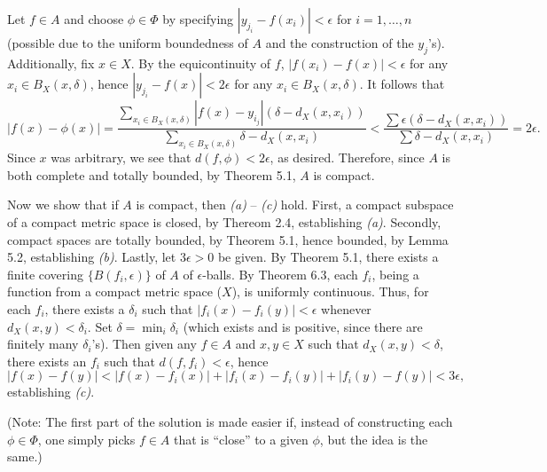 \documentclass{article}
\begin{document}
\begin{enumerate}
Let \(f \in A\) and choose \(\phi \in \Phi\) by specifying \(\left| y_{j_i} - f(x_i) \right| < \epsilon\) for \(i = 1, \ldots, n\) (possible due to the uniform boundedness of \(A\) and the construction of the \(y_j\)'s).  Additionally, fix \(x \in X\).  By the equicontinuity of \(f\), \(|f(x_i) - f(x)| < \epsilon\) for any \(x_i \in B_X(x,\delta)\), hence \(\left| y_{j_i} - f(x) \right| < 2\epsilon\) for any \(x_i \in B_X(x,\delta)\).  It follows that
\[|f(x) - \phi(x)| = \frac{\sum_{x_i \in B_X(x,\delta)} \left| f(x) - y_{i_j} \right| (\delta - d_X(x,x_i))}{\sum_{x_i \in B_X(x,\delta)} \delta - d_X(x,x_i)} < \frac{\sum \epsilon (\delta - d_X(x,x_i))}{\sum \delta - d_X(x,x_i)} = 2\epsilon.\]
Since \(x\) was arbitrary, we see that \(d(f,\phi) < 2\epsilon\), as desired.  Therefore, since \(A\) is both complete and totally bounded, by Theorem 5.1, \(A\) is compact.

Now we show that if \(A\) is compact, then {\em (a)} -- {\em (c)} hold.  First, a compact subspace of a compact metric space is closed, by Thereom 2.4, establishing {\em (a)}.  Secondly, compact spaces are totally bounded, by Theorem 5.1, hence bounded, by Lemma 5.2, establishing {\em (b)}.  Lastly, let \(3\epsilon > 0\) be given.  By Theorem 5.1, there exists a finite covering \(\{B(f_i,\epsilon)\}\) of \(A\) of \(\epsilon\)-balls.  By Theorem 6.3, each \(f_i\), being a function from a compact metric space (\(X\)), is uniformly continuous.  Thus, for each \(f_i\), there exists a \(\delta_i\) such that \(|f_i(x) - f_i(y)| < \epsilon\) whenever \(d_X(x,y) < \delta_i\).  Set \(\delta = \min_i \delta_i\) (which exists and is positive, since there are finitely many \(\delta_i\)'s).  Then given any \(f \in A\) and \(x,y \in X\) such that \(d_X(x,y) < \delta\), there exists an \(f_i\) such that \(d(f,f_i) < \epsilon\), hence
\[|f(x) - f(y)| < |f(x) - f_i(x)| + |f_i(x) - f_i(y)| + |f_i(y) - f(y)| < 3\epsilon,\]
establishing {\em (c)}.

(Note:  The first part of the solution is made easier if, instead of constructing each \(\phi \in \Phi\), one simply picks \(f \in A\) that is ``close'' to a given \(\phi\), but the idea is the same.)
  



\end{enumerate}
\end{document}
